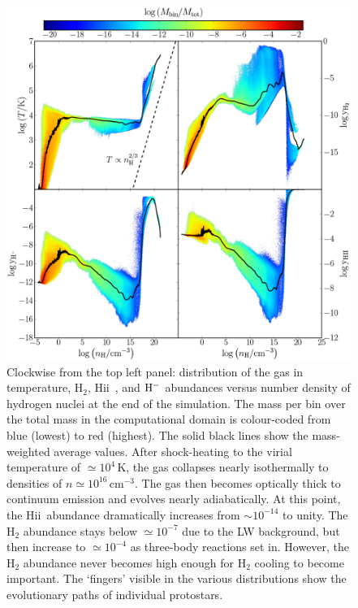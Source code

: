 \documentclass[useAMS,usenatbib]{mnras}
\newcommand{\cmmm}{\text{cm}^{-3}}
\newcommand{\HH}{\text{H}_2}          %
\newcommand{\HM}{{\rm H}^{-}}     %
\newcommand{\HII}{H{\sc ii}~}    %
\begin{document}
\begin{figure}
\begin{center}
\includegraphics[scale=0.61]{./f3.png}
\caption{Clockwise from the top left panel: distribution of the gas in temperature, $\HH$, \HII, and $\HM$ abundances versus number density of hydrogen nuclei at the end of the simulation. The mass per bin over the total mass in the computational domain is colour-coded from blue (lowest) to red (highest). The solid black lines show the mass-weighted average values. After shock-heating to the virial temperature of $\simeq 10^4\,$K, the gas collapses nearly isothermally to densities of $n \simeq 10^{16}\,\cmmm$. The gas then becomes optically thick to continuum emission and evolves nearly adiabatically. At this point, the \HII abundance dramatically increases from $\sim 10^{-14}$ to unity. The H$_2$ abundance stays below $\simeq 10^{-7}$ due to the LW background, but then increase to $\simeq 10^{-4}$ as three-body reactions set in. However, the H$_2$ abundance never becomes high enough for H$_2$ cooling to become important. The `fingers' visible in the various distributions show the evolutionary paths of individual protostars.}
\label{fig:pspace_T_ab}
\end{center}
\end{figure}
                
\end{document}
